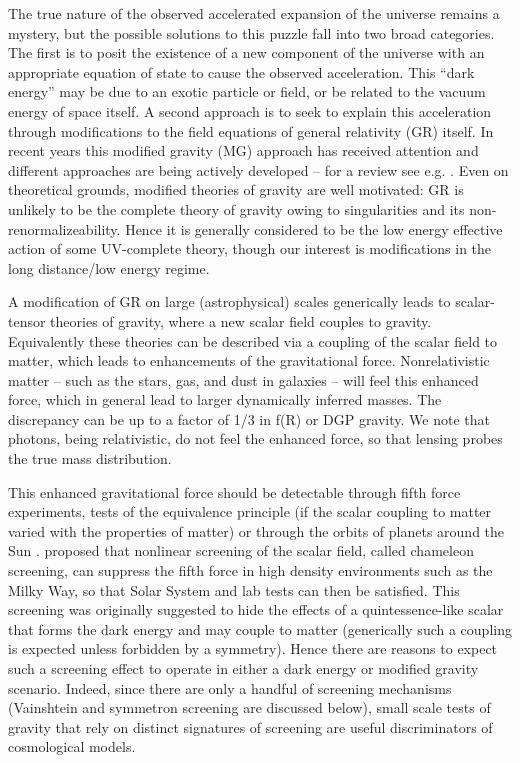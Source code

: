 \documentclass[useAMS,usenatbib,twocolumn]{mn2e}
\newcommand{\jakesays}[1]{{\color{red}[Jake says: #1]}}
\begin{document}
The true nature of the observed accelerated expansion of the universe remains a
mystery, but the possible solutions to this puzzle fall into two broad
categories. The first is to posit the existence of a new component of the
universe with an appropriate equation of state to cause the observed
acceleration. This ``dark energy'' may be due to an exotic particle or field, or
be related to the vacuum energy of space itself. A second approach is to seek to
explain this acceleration through modifications to the field equations of
general relativity (GR) itself. In recent years this modified gravity (MG)
approach has received attention and different approaches are being actively
developed -- for a review see e.g. \citet{jain-khoury10}. 
Even on theoretical grounds, modified theories of gravity are well
motivated: GR is unlikely to be the complete theory of gravity owing to 
singularities and its non-renormalizeability. Hence it is generally
considered to be the low energy effective action of some UV-complete
theory, though our interest is modifications in the long distance/low energy
regime. 
 
 A modification of GR on large (astrophysical) scales generically leads to
scalar-tensor theories of gravity, where a new scalar field couples to gravity.
Equivalently these theories can be described via a coupling of the scalar field
to matter, which leads to enhancements of the gravitational force.
Nonrelativistic matter -- such as the stars, gas, and dust in galaxies -- will
feel this enhanced force, which in general lead to larger dynamically inferred
masses. The discrepancy can be up to a factor of 1/3 in f(R) or DGP gravity. We
note that photons, being relativistic, do not feel the enhanced force, so that
lensing probes the true mass distribution.
 
This enhanced gravitational force should be detectable through fifth force 
experiments, tests of the equivalence principle (if the scalar coupling to
matter varied with the properties of matter) or through the orbits of planets
around the Sun \citep{will06}. \citet{khoury04} proposed that
nonlinear screening of the scalar field, called chameleon screening, can
suppress the fifth force in high density environments such as the Milky Way, so
that Solar System and lab tests can then be satisfied. This screening was
originally suggested to hide the effects of a quintessence-like scalar that
forms the dark energy and may couple to matter (generically such a coupling is
expected unless forbidden by a symmetry). Hence there are reasons to expect such
a screening effect to operate in either a dark energy or modified gravity
scenario. Indeed, since there are only a handful of screening mechanisms
(Vainshtein and symmetron screening are discussed below), small scale tests of
gravity that rely on distinct signatures of screening are useful discriminators
of cosmological models.
 
\end{document}
